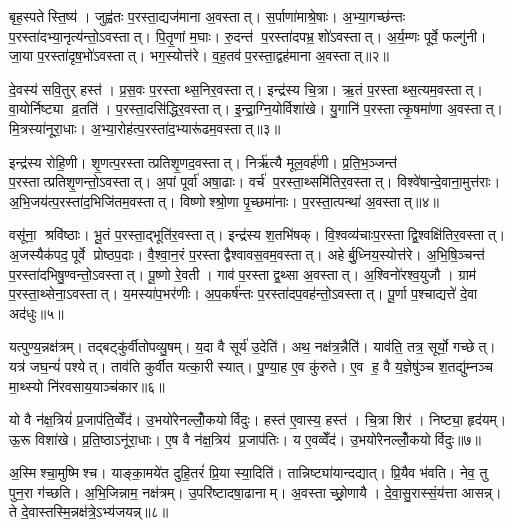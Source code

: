 बृह॒स्पतेस्ति॒ष्य॑। जुह्व॑तः प॒रस्ता॒द्यज॑माना अ॒वस्तात्। स॒र्पाणा॑माश्रे॒षाः। अ॒भ्या॒गच्छ॑न्तः प॒रस्ता॑दभ्या॒नृत्य॑न्तो॒ऽवस्तात्। पि॒तृ॒णां म॒घाः। रु॒दन्त॑ प॒रस्ता॑दपभ्र॒शो॑ऽवस्तात्। अ॒र्य॒म्णः पूर्वे॒ फल्गु॑नी। जा॒या प॒रस्ता॑दृष॒भो॑ऽवस्तात्। भग॒स्योत्त॑रे। व॒ह॒तव॑प॒रस्ता॒द्वह॑माना अ॒वस्तात्॥२॥

दे॒वस्य॑ सवि॒तुर् हस्त॑। प्र॒स॒वः प॒रस्ताथ्स॒निर॒वस्तात्। इन्द्र॑स्य चि॒त्रा। ऋ॒तं प॒रस्ताथ्स॒त्यम॒वस्तात्। वा॒योर्निष्ट्या व्र॒तति॑। प॒रस्ता॒दसि॑द्धिर॒वस्तात्। इ॒न्द्रा॒ग्नि॒योर्विशा॑खे। यु॒गानि॑ प॒रस्तात्कृ॒षमा॑णा अ॒वस्तात्। मि॒त्रस्या॑नूरा॒धाः। अ॒भ्या॒रोह॑त्प॒रस्ता॑द॒भ्यारू॑ढम॒वस्तात्॥३॥

इन्द्र॑स्य रोहि॒णी। शृ॒णत्प॒रस्तात्प्रतिशृ॒णद॒वस्तात्। निर्\mbox{}ऋ॑त्यै मूल॒वर्\mbox{}ह॑णी। प्र॒ति॒भ॒ञ्जन्त॑ प॒रस्तात्प्रतिशृ॒णन्तो॒ऽवस्तात्। अ॒पां पूर्वा॑ अषा॒ढाः। वर्च॑ प॒रस्ता॒थ्समि॑तिर॒वस्तात्। विश्वे॑षान्दे॒वाना॒मुत्त॑राः। अ॒भि॒जय॑त्प॒रस्ता॑द॒भिजि॑तम॒वस्तात्। विष्णोश्श्रो॒णा पृ॒च्छमा॑नाः। प॒रस्ता॒त्पन्था॑ अ॒वस्तात्॥४॥

वसू॑ना॒ श्रवि॑ष्ठाः। भू॒तं प॒रस्ता॒द्भूति॑र॒वस्तात्। इन्द्र॑स्य श॒तभि॑षक्। वि॒श्वव्य॑चाःप॒रस्ताद्वि॒श्वक्षि॑तिर॒वस्तात्। अ॒जस्यैक॑पद॒पूर्वे प्रोष्ठप॒दाः। वै॒श्वा॒न॒रं प॒रस्ताद्वैश्वावस॒वम॒वस्तात्। अहेर्बु॒ध्निय॒स्योत्त॑रे। अ॒भि॒षि॒ञ्चन्त॑ प॒रस्ता॑दभिषु॒ण्वन्तो॒ऽवस्तात्। पू॒ष्णो रे॒वती। गाव॑प॒रस्ताद्व॒थ्सा अ॒वस्तात्। अ॒श्विनो॑रश्व॒युजौ। ग्राम॑ प॒रस्ता॒थ्सेना॒ऽवस्तात्। य॒मस्या॑प॒भर॑णीः। अ॒प॒कर्\mbox{}ष॑न्तः प॒रस्ता॑दप॒वह॑न्तो॒ऽवस्तात्। पू॒र्णा प॒श्चाद्यत्ते॑ दे॒वा अद॑धुः॥५॥\anuvakamend[आ॒र्द्रम॒वस्ता॒द्वह॑माना अ॒वस्ता॑द॒भ्यारू॑ढम॒वस्ता॒त्पन्था॑ अ॒वस्ताद्व॒थ्सा अ॒वस्ता॒त्पञ्च॑ च]

यत्पुण्य॒न्नक्ष॑त्रम्। तद्बट्कु॑र्वीतोपव्यु॒षम्। य॒दा वै सूर्य॑ उ॒देति॑। अथ॒ नक्ष॑त्र॒न्नैति॑। याव॑ति॒ तत्र॒ सूर्यो॒ गच्छेत्। यत्र॑ जघ॒न्यं॑ पश्येत्। ताव॑ति कुर्वीत यत्का॒री स्यात्। पु॒ण्या॒ह ए॒व कु॑रुते। ए॒व ह॒ वै य॒ज्ञेषु॑ञ्च श॒तद्यु॑म्नञ्च मा॒थ्स्यो नि॑रवसाय॒याञ्च॑कार॥६॥

यो वै न॑क्ष॒त्रियं॑ प्र॒जाप॑ति॒व्वेँद॑। उ॒भयो॑रेनल्लोँ॒कयोर्विदुः। हस्त॑ ए॒वास्य॒ हस्त॑। चि॒त्रा शिर॑। निष्ट्या॒ हृद॑यम्। ऊ॒रू विशा॑खे। प्र॒ति॒ष्ठाऽनू॑रा॒धाः। ए॒ष वै न॑क्ष॒त्रिय॑ प्र॒जाप॑तिः। य ए॒वव्वेँद॑। उ॒भयो॑रेनल्लोँ॒कयोर्विदुः॥७॥

अ॒स्मिश्चा॒मुष्मिश्च। याङ्का॒मये॑त दुहि॒तरं॑ प्रि॒या स्या॒दिति॑। तान्निष्ट्या॑यान्दद्यात्। प्रि॒यैव भ॑वति। नेव॒ तु पुन॒रा ग॑च्छति। अ॒भि॒जिन्नाम॒ नक्ष॑त्रम्। उ॒परि॑ष्टादषा॒ढानाम्। अ॒वस्ताच्छ्रो॒णायै। दे॒वा॒सु॒रास्सं॒य॑त्ता आसन्न्। ते दे॒वास्तस्मि॒न्नक्ष॑त्रे॒ऽभ्य॑जयन्न्॥८॥

